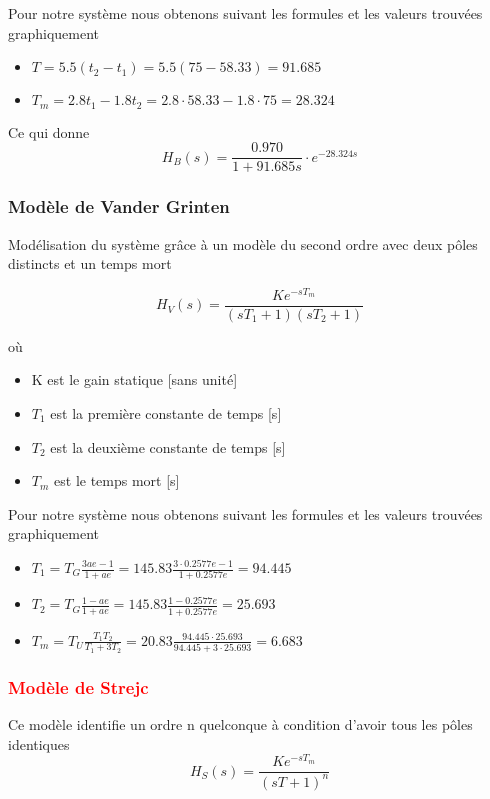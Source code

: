 Pour notre système nous obtenons suivant les formules et les valeurs trouvées graphiquement 
\begin{itemize}
\item $T = 5.5 (t_{2} - t_{1}) = 5.5 (75 - 58.33) = 91.685$
\item $T_{m} = 2.8 t_{1} - 1.8 t_{2} = 2.8 \cdot 58.33 - 1.8 \cdot 75 = 28.324$
\end{itemize}

Ce qui donne 
\begin{equation}
H_{B}(s) = \frac{0.970}{1 + 91.685s } \cdot e^{-28.324s}
\end{equation}

\subsubsection{Modèle de Vander Grinten}
Modélisation du système grâce à un modèle du second ordre avec deux pôles distincts et un temps mort

\begin{equation}
H_{V}(s) = \frac{K e^{-s T_{m}}}{(sT_{1} + 1) (sT_{2} + 1)}
\end{equation}

où 
\begin{itemize}
\item K est le gain statique [sans unité]
\item $T_{1}$ est la première constante de temps [s]
\item $T_{2}$ est la deuxième constante de temps [s]
\item $T_{m}$ est le temps mort [s]
\end{itemize}

Pour notre système nous obtenons suivant les formules et les valeurs trouvées graphiquement 
\begin{itemize}
\item $T_{1} = T_{G} \frac{3ae - 1}{1 + ae} = 145.83 \frac{3 \cdot 0.2577e - 1}{1 + 0.2577e} = 94.445$
\item $T_{2} = T_{G} \frac{1 - ae}{1 + ae} = 145.83 \frac{1 - 0.2577e}{1 + 0.2577e} = 25.693$
\item $T_{m} = T_{U} \frac{T_{1}T_{2}}{T_{1} + 3T_{2}} = 20.83 \frac{94.445 \cdot 25.693}{94.445 + 3 \cdot 25.693} = 6.683$
\end{itemize}

\subsubsection{\textcolor{red}{Modèle de Strejc}}
Ce modèle identifie un ordre n quelconque à condition d'avoir tous les pôles identiques
\begin{equation}
H_{S}(s) = \frac{K e^{-s T_{m}}}{(sT + 1)^{n}}
\end{equation}

